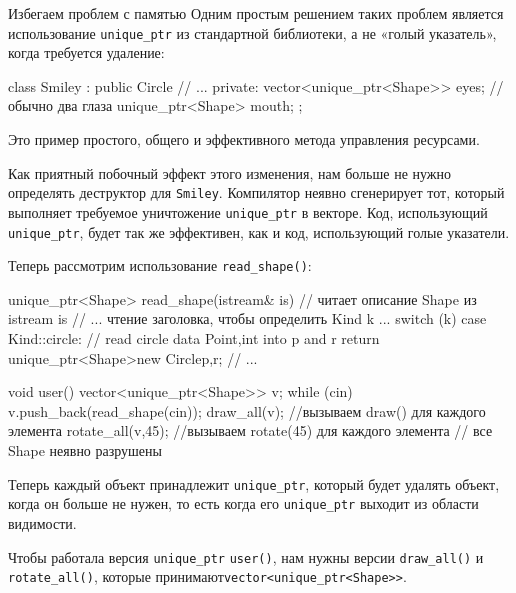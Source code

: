 \documentclass[
    8pt,
    hyperref={pdfencoding=unicode}
    ]{beamer}
\theoremstyle{definition}
\begin{document}
\begin{frame}{Избегаем проблем с памятью}
    Одним простым решением таких проблем является использование \texttt{unique_ptr} из стандартной библиотеки, а не «голый указатель», когда требуется удаление:
    \begin{cppcode}
        class Smiley : public Circle {
            // ...
            private:
            vector<unique_ptr<Shape>> eyes; // обычно два глаза
            unique_ptr<Shape> mouth;
        };
    \end{cppcode}
    Это пример простого, общего и эффективного метода управления ресурсами.
    \vspace{1em}
    
    Как приятный побочный эффект этого изменения, нам больше не нужно определять деструктор для \texttt{Smiley}. Компилятор неявно сгенерирует тот, который выполняет требуемое уничтожение \texttt{unique_ptr} в векторе. Код, использующий \texttt{unique_ptr}, будет так же эффективен, как и код, использующий голые указатели.
    
    \newpage
    
    \small
    Теперь рассмотрим использование \texttt{read_shape()}:
    \begin{cppcode}
        unique_ptr<Shape> read_shape(istream& is) // читает описание Shape из istream is
        {
            // ... чтение заголовка, чтобы определить Kind k ...
            switch (k) {
                case Kind::circle:
                // read circle data {Point,int} into p and r
                return unique_ptr<Shape>{new Circle{p,r}}; 
                // ...
            }
        }
    \end{cppcode}

    \begin{cppcode}
        void user()
        {
            vector<unique_ptr<Shape>> v;
            while (cin)
            v.push_back(read_shape(cin));
            draw_all(v); //вызываем draw() для каждого элемента
            rotate_all(v,45); //вызываем rotate(45) для каждого элемента
        } // все Shape неявно разрушены
    \end{cppcode}
    Теперь каждый объект принадлежит \texttt{unique_ptr}, который будет удалять объект,
    когда он больше не нужен, то есть когда его \texttt{unique_ptr} выходит из области видимости.
    
    Чтобы работала версия \texttt{unique_ptr} \texttt{user()}, нам нужны версии \texttt{draw_all()} и \texttt{rotate_all()}, которые принимают\texttt{vector<unique_ptr<Shape>>}.
\end{frame}
\end{document}
